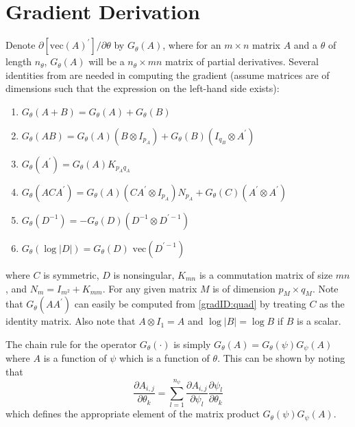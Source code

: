 \documentclass[12pt]{article}
\newcommand{\Gt}{G_\theta}
\newcommand{\vecop}[0]{\text{vec}}
\begin{document}
\appendix
\newpage
\section{Gradient Derivation} \label{sec:gradient_derivation}
	Denote $\partial \left[ \vecop(A)^\prime \right] / \partial \theta$ by $\Gt(A)$, where for an $m \times n$ matrix $A$ and a $\theta$ of length $n_\theta$, $\Gt(A)$ will be a $n_\theta \times mn$ matrix of partial derivatives. Several identities from \cite{nagakura} are needed in computing the gradient (assume matrices are of dimensions such that the expression on the left-hand side exists):

	\begin{enumerate}[label=(\alph*)]
	\item \label{gradID:sum} $\Gt(A + B) = \Gt(A) + \Gt(B)$
	\item \label{gradID:mult} $\Gt(A B) = \Gt(A) (B \otimes I_{p_A}) + \Gt(B)(I_{q_B} \otimes A^\prime)$
	\item \label{gradID:trans} $\Gt(A^\prime) = \Gt(A) K_{p_A q_A}$ 
	\item \label{gradID:quad} $\Gt(ACA^\prime) = \Gt(A)(CA^\prime \otimes I_{p_A}) N_{p_A} + \Gt(C)(A^\prime \otimes A^\prime)$
	\item \label{gradID:inv} $\Gt(D^{-1}) = -\Gt(D)(D^{-1} \otimes D^{\prime-1})$ 
	\item \label{gradID:logdet} $\Gt(\log |D|) = \Gt(D) \text{ vec} (D^{\prime-1})$
	\end{enumerate}
	where $C$ is symmetric, $D$ is nonsingular, $K_{mn}$ is a commutation matrix of size $mn$, and $N_m = I_{m^2} + K_{mm}$. For any given matrix $M$ is of dimension $p_M \times q_M$. Note that $\Gt(AA^\prime)$ can easily be computed from \ref{gradID:quad} by treating $C$ as the identity matrix. Also note that $A \otimes I_1 = A$ and $\log |B| = \log B$ if $B$ is a scalar. 

	The chain rule for the operator $\Gt(\cdot)$ is simply $\Gt(A) = \Gt(\psi) G_\psi(A)$ where $A$ is a function of $\psi$ which is a function of $\theta$. This can be shown by noting that 
	\begin{equation*}
	\frac{\partial A_{i,j}}{\partial \theta_k} = \sum_{l = 1}^{n_\psi} \frac{\partial A_{i,j}}{\partial \psi_l} \frac{\partial \psi_l}{\partial \theta_k}
	\end{equation*}
	which defines the appropriate element of the matrix product $\Gt(\psi)G_\psi(A)$.

 

\end{document}
